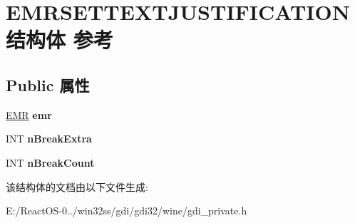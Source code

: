 \hypertarget{struct_e_m_r_s_e_t_t_e_x_t_j_u_s_t_i_f_i_c_a_t_i_o_n}{}\section{E\+M\+R\+S\+E\+T\+T\+E\+X\+T\+J\+U\+S\+T\+I\+F\+I\+C\+A\+T\+I\+O\+N结构体 参考}
\label{struct_e_m_r_s_e_t_t_e_x_t_j_u_s_t_i_f_i_c_a_t_i_o_n}
\subsection*{Public 属性}
\begin{DoxyCompactItemize}
\item 
\mbox{\label{struct_e_m_r_s_e_t_t_e_x_t_j_u_s_t_i_f_i_c_a_t_i_o_n_a651232a0598b89d1aa79c473d5961c4c}} 
\hyperlink{structtag_e_m_r}{E\+MR} {\bfseries emr}
\item 
\mbox{\label{struct_e_m_r_s_e_t_t_e_x_t_j_u_s_t_i_f_i_c_a_t_i_o_n_ae1e0e12d6d0ee348a798c7c93f46a96e}} 
I\+NT {\bfseries n\+Break\+Extra}
\item 
\mbox{\label{struct_e_m_r_s_e_t_t_e_x_t_j_u_s_t_i_f_i_c_a_t_i_o_n_af2697d111ac2bef9867f615840a6f86b}} 
I\+NT {\bfseries n\+Break\+Count}
\end{DoxyCompactItemize}


该结构体的文档由以下文件生成\+:\begin{DoxyCompactItemize}
\item 
E\+:/\+React\+O\+S-\/0../win32ss/gdi/gdi32/wine/gdi\+\_\+private.\+h\end{DoxyCompactItemize}
